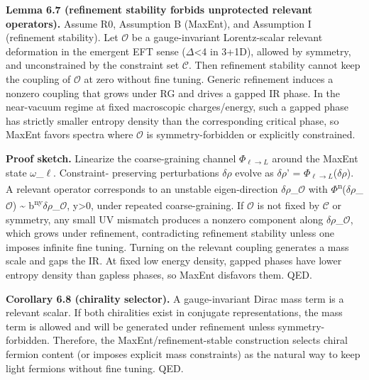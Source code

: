 \documentclass[11pt,a4paper]{article}
\theoremstyle{remark}
\begin{document}
\textbf{Lemma 6.7 (refinement stability forbids unprotected relevant operators).}
Assume R0, Assumption B (MaxEnt), and Assumption I (refinement stability).
Let \ensuremath{\mathcal{O}} be a gauge-invariant Lorentz-scalar relevant deformation
in the emergent EFT sense (\ensuremath{\Delta}\textless4 in 3+1D), allowed by symmetry,
and unconstrained by the constraint set \ensuremath{\mathcal{C}}. Then refinement stability
cannot keep the coupling of \ensuremath{\mathcal{O}} at zero without fine tuning.
Generic refinement induces a nonzero coupling that grows under RG and
drives a gapped IR phase. In the near-vacuum regime at fixed macroscopic
charges/energy, such a gapped phase has strictly smaller entropy density
than the corresponding critical phase, so MaxEnt favors spectra where
\ensuremath{\mathcal{O}} is symmetry-forbidden or explicitly constrained.

\textbf{Proof sketch.} Linearize the coarse-graining channel
$\Phi_{\ensuremath{\ell}\ensuremath{\to}L}$ around the MaxEnt state \ensuremath{\omega}\_\ensuremath{\ell}. Constraint-
preserving perturbations \ensuremath{\delta}\ensuremath{\rho} evolve as
\ensuremath{\delta}\ensuremath{\rho}' = $\Phi_{\ensuremath{\ell}\ensuremath{\to}L}$(\ensuremath{\delta}\ensuremath{\rho}). A relevant operator corresponds
to an unstable eigen-direction \ensuremath{\delta}\ensuremath{\rho}\_\ensuremath{\mathcal{O}} with
\textbar \ensuremath{\Phi}\textsuperscript{n}(\ensuremath{\delta}\ensuremath{\rho}\_\ensuremath{\mathcal{O}})\textbar{} \textasciitilde{} b\textsuperscript{n}\textsuperscript{y}\textbar \ensuremath{\delta}\ensuremath{\rho}\_\ensuremath{\mathcal{O}}\textbar,
y\textgreater0, under repeated coarse-graining. If \ensuremath{\mathcal{O}} is not fixed by
\ensuremath{\mathcal{C}} or symmetry, any small UV mismatch produces a nonzero
component along \ensuremath{\delta}\ensuremath{\rho}\_\ensuremath{\mathcal{O}}, which grows under refinement,
contradicting refinement stability unless one imposes infinite fine tuning.
Turning on the relevant coupling generates a mass scale and gaps the IR.
At fixed low energy density, gapped phases have lower entropy density than
gapless phases, so MaxEnt disfavors them. QED.

\textbf{Corollary 6.8 (chirality selector).} A gauge-invariant Dirac mass term is
a relevant scalar. If both chiralities exist in conjugate representations,
the mass term is allowed and will be generated under refinement unless
symmetry-forbidden. Therefore, the MaxEnt/refinement-stable construction
selects chiral fermion content (or imposes explicit mass constraints) as the
natural way to keep light fermions without fine tuning. QED.
\end{document}
